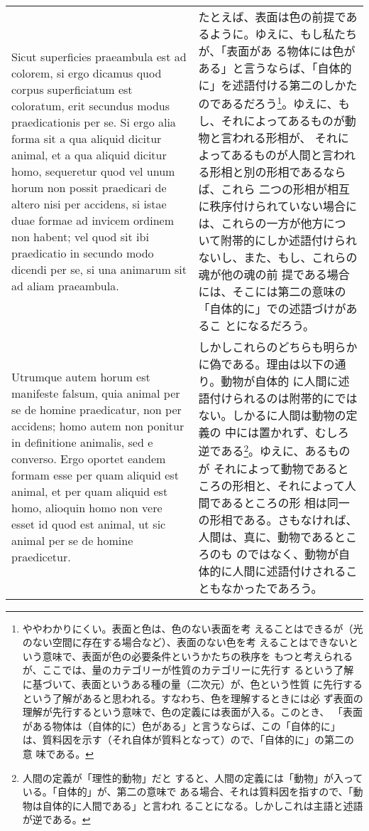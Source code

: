 \documentclass[paper=a4paper,fontsize=10pt,jafontsize=9pt,titlepage]{jlreq}
\begin{document}
\begin{longtable}{p{21em}p{21em}}
\\

 Sicut superficies praeambula est ad colorem, si ergo dicamus quod
 corpus superficiatum est coloratum, erit secundus modus
 praedicationis per se. Si ergo alia forma sit a qua aliquid dicitur
 animal, et a qua aliquid dicitur homo, sequeretur quod vel unum horum
 non possit praedicari de altero nisi per accidens, si istae duae
 formae ad invicem ordinem non habent; vel quod sit ibi praedicatio in
 secundo modo dicendi per se, si una animarum sit ad aliam praeambula.

&

たとえば、表面は色の前提であるように。ゆえに、もし私たちが、「表面があ
る物体には色がある」と言うならば、「自体的に」を述語付ける第二のしかた
のであるだろう\footnote{ややわかりにくい。表面と色は、色のない表面を考
えることはできるが（光のない空間に存在する場合など）、表面のない色を考
えることはできないという意味で、表面が色の必要条件というかたちの秩序を
もつと考えられるが、ここでは、量のカテゴリーが性質のカテゴリーに先行す
るという了解に基づいて、表面というある種の量（二次元）が、色という性質
に先行するという了解があると思われる。すなわち、色を理解するときには必
ず表面の理解が先行するという意味で、色の定義には表面が入る。このとき、
「表面がある物体は（自体的に）色がある」と言うならば、この「自体的に」
は、質料因を示す（それ自体が質料となって）ので、「自体的に」の第二の意
味である。}。ゆえに、もし、それによってあるものが動物と言われる形相が、
それによってあるものが人間と言われる形相と別の形相であるならば、これら
二つの形相が相互に秩序付けられていない場合には、これらの一方が他方につ
いて附帯的にしか述語付けられないし、また、もし、これらの魂が他の魂の前
提である場合には、そこには第二の意味の「自体的に」での述語づけがあるこ
とになるだろう。
 
\\

 Utrumque autem horum est manifeste falsum, quia animal per se de
 homine praedicatur, non per accidens; homo autem non ponitur in
 definitione animalis, sed e converso. Ergo oportet eandem formam esse
 per quam aliquid est animal, et per quam aliquid est homo, alioquin
 homo non vere esset id quod est animal, ut sic animal per se de
 homine praedicetur.

&

しかしこれらのどちらも明らかに偽である。理由は以下の通り。動物が自体的
に人間に述語付けられるのは附帯的にではない。しかるに人間は動物の定義の
中には置かれず、むしろ逆である\footnote{人間の定義が「理性的動物」だと
すると、人間の定義には「動物」が入っている。「自体的」が、第二の意味で
ある場合、それは質料因を指すので、「動物は自体的に人間である」と言われ
ることになる。しかしこれは主語と述語が逆である。}。ゆえに、あるものが
それによって動物であるところの形相と、それによって人間であるところの形
相は同一の形相である。さもなければ、人間は、真に、動物であるところのも
のではなく、動物が自体的に人間に述語付けされることもなかったであろう。
 

\end{longtable}
\end{document}
